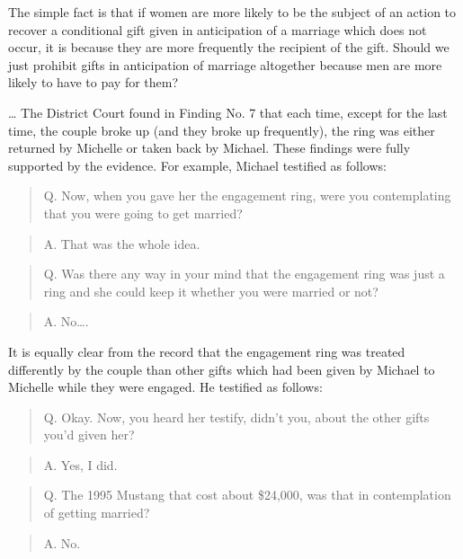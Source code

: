The simple fact is that if women are more likely to be the subject of an action
to recover a conditional gift given in anticipation of a marriage which does
not occur, it is because they are more frequently the recipient of the gift.
Should we just prohibit gifts in anticipation of marriage altogether because
men are more likely to have to pay for them?

\dots{} The District Court found in Finding No. 7 that each time, except for the
last time, the couple broke up (and they broke up frequently), the ring was
either returned by Michelle or taken back by Michael. These findings were fully
supported by the evidence. For example, Michael testified as follows:

\begin{quote}
Q. Now, when you gave her the engagement ring, were you contemplating that you
were going to get married?
\end{quote}

\begin{quote}
A. That was the whole idea.
\end{quote}

\begin{quote}
Q. Was there any way in your mind that the engagement ring was just a ring and
she could keep it whether you were married or not?
\end{quote}

\begin{quote}
A. No\dots{}.
\end{quote}

It is equally clear from the record that the engagement ring was treated
differently by the couple than other gifts which had been given by Michael to
Michelle while they were engaged. He testified as follows:

\begin{quote}
Q. Okay. Now, you heard her testify, didn't you, about the other gifts you'd
given her?
\end{quote}

\begin{quote}
A. Yes, I did.
\end{quote}

\begin{quote}
Q. The 1995 Mustang that cost about \$24,000, was that in contemplation of
getting married?
\end{quote}

\begin{quote}
A. No.
\end{quote}

